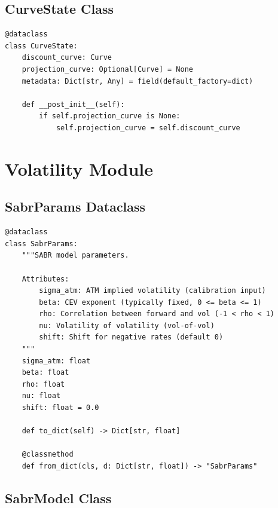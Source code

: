 \documentclass[12pt,a4paper]{report}
\begin{document}
\subsection{CurveState Class}

\begin{lstlisting}
@dataclass
class CurveState:
    discount_curve: Curve
    projection_curve: Optional[Curve] = None
    metadata: Dict[str, Any] = field(default_factory=dict)
    
    def __post_init__(self):
        if self.projection_curve is None:
            self.projection_curve = self.discount_curve
\end{lstlisting}

\section{Volatility Module}

\subsection{SabrParams Dataclass}

\begin{lstlisting}
@dataclass
class SabrParams:
    """SABR model parameters.
    
    Attributes:
        sigma_atm: ATM implied volatility (calibration input)
        beta: CEV exponent (typically fixed, 0 <= beta <= 1)
        rho: Correlation between forward and vol (-1 < rho < 1)
        nu: Volatility of volatility (vol-of-vol)
        shift: Shift for negative rates (default 0)
    """
    sigma_atm: float
    beta: float
    rho: float
    nu: float
    shift: float = 0.0
    
    def to_dict(self) -> Dict[str, float]
    
    @classmethod
    def from_dict(cls, d: Dict[str, float]) -> "SabrParams"
\end{lstlisting}

\subsection{SabrModel Class}
\end{document}
